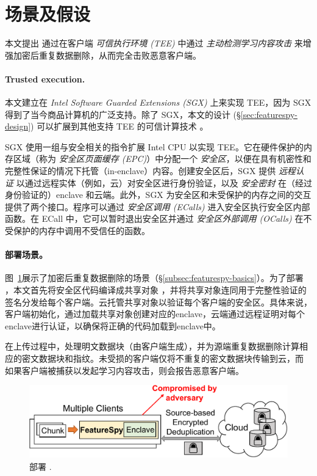 \section{场景及假设}
\label{sec:featurespy-setting}
本文提出 \sysnameF 通过在客户端 {\em 可信执行环境 (TEE)} 中通过 {\em 主动检测学习内容攻击} 来增强加密后重复数据删除，从而完全击败恶意客户端。

\paragraph*{Trusted execution.} 本文建立在 {\em Intel Software Guarded Extensions (SGX)} \cite{sgx} 上来实现 TEE，因为 SGX 得到了当今商品计算机的广泛支持。除了 SGX，本文的设计 (\S\ref{sec:featurespy-design}) 可以扩展到其他支持 TEE 的可信计算技术 \cite{AMDSEV, pinto19}。

SGX 使用一组与安全相关的指令扩展 Intel CPU 以实现 TEE。它在硬件保护的内存区域（称为 {\em 安全区页面缓存 (EPC)}）中分配一个 {\em 安全区}，以便在具有机密性和完整性保证的情况下托管（in-enclave）内容。创建安全区后，SGX 提供 {\em 远程认证} 以通过远程实体（例如，云）对安全区进行身份验证，以及 {\em 安全密封} 在（经过身份验证的）enclave 和云端。此外，SGX 为安全区和未受保护的内存之间的交互提供了两个接口。程序可以通过 {\em 安全区调用 (ECalls)} 进入安全区执行安全区内部函数。在 ECall 中，它可以暂时退出安全区并通过 {\em 安全区外部调用 (OCalls)} 在不受保护的内存中调用不受信任的函数。



\paragraph*{部署场景。}图~\ref{fig:featurespy-model}展示了加密后重复数据删除的场景（\S\ref{subsec:featurespy-basics}）。为了部署 \sysnameF，本文首先将安全区代码编译成共享对象 \cite{sgx}，并将共享对象连同用于完整性验证的签名分发给每个客户端。云托管共享对象以验证每个客户端的安全区。具体来说，客户端初始化\sysnameF，通过加载共享对象创建对应的enclave，云端通过远程证明\cite{sgx}对每个enclave进行认证，以确保将正确的代码加载到enclave中。

在上传过程中，\sysnameF 处理明文数据块（由客户端生成），并为源端重复数据删除计算相应的密文数据块和指纹。未受损的客户端仅将不重复的密文数据块传输到云，而 \sysnameF 如果客户端被捕获以发起学习内容攻击，则会报告恶意客户端。

\begin{figure}
    \centering
    \includegraphics[width=\textwidth]{pic/featurespy/deployment.pdf}
    \vspace{-6pt}
    \caption{部署 \sysnameF.}
    \label{fig:featurespy-model}
    \vspace{-6pt}
\end{figure}

